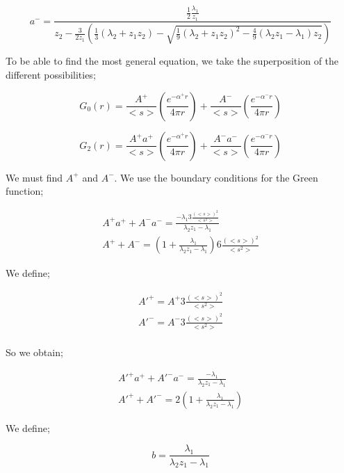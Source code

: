 \documentclass[a4paper, 12pt]{report}
\newcommand{\bl}{\big<}
\newcommand{\bg}{\big>}
\begin{document}
\begin{equation}
a^- = \frac{\frac{1}{2}\frac{\lambda_1}{z_1}}{z_2-\frac{3}{2z_1}\left(\frac{1}{3}\left(\lambda_2+z_1z_2\right) - \sqrt{\frac{1}{9}(\lambda_2+z_1z_2)^2 - \frac{4}{9}(\lambda_2z_1-\lambda_1)z_2}\right)}
\end{equation}

To be able to find the most general equation, we take the superposition of the different possibilities;

\begin{equation}
G_0(r) = \frac{A^+}{\bl s \bg} \left(\frac{e^{-\alpha^+ r}}{4\pi r}\right) +  \frac{A^-}{\bl s \bg} \left(\frac{e^{-\alpha^- r}}{4\pi r}\right)
\end{equation}

\begin{equation}
G_2(r) = \frac{A^+a^+}{\bl s \bg} \left(\frac{e^{-\alpha^+ r}}{4\pi r}\right) +  \frac{A^-a^-}{\bl s \bg} \left(\frac{e^{-\alpha^- r}}{4\pi r}\right)
\end{equation}

We must find $A^+$ and $A^-$. We use the boundary conditions for the Green function;

\begin{align}
A^+a^+ + A^-a^- = \frac{-\lambda_1 3\frac{\left({\bl s \bg}\right)^2}{{{\bl s^2 \bg}}}}{\lambda_2z_1-\lambda_1}\\
A^+ + A^- = \left( 1 + \frac{\lambda_1}{\lambda_2z_1-\lambda_1} \right)6\frac{\left({\bl s \bg}\right)^2}{{{\bl s^2 \bg}}}
\end{align}

We define;

\begin{align}
A'^+ = A^+ 3\frac{\left({\bl s \bg}\right)^2}{{{\bl s^2 \bg}}}\\
A'^- = A^- 3\frac{\left({\bl s \bg}\right)^2}{{{\bl s^2 \bg}}}\\
\end{align}

So we obtain;

\begin{align}
A'^+a^+ + A'^-a^- = \frac{-\lambda_1}{\lambda_2z_1-\lambda_1}\\
A'^+ + A'^- = 2\left( 1 + \frac{\lambda_1}{\lambda_2z_1-\lambda_1} \right)
\end{align}

We define;

\begin{equation}
b = \frac{\lambda_1}{\lambda_2z_1-\lambda_1}
\end{equation}
\end{document}

